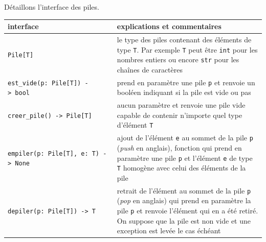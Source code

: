 \documentclass[a4paper,17pt]{extarticle}
\begin{document}
    Détaillons l'interface des piles.

\begin{longtable}[]{@{}ll@{}}
\toprule
\begin{minipage}[b]{0.47\columnwidth}\raggedright
interface\strut
\end{minipage} & \begin{minipage}[b]{0.47\columnwidth}\raggedright
explications et commentaires\strut
\end{minipage}\tabularnewline
\midrule
\endhead
\begin{minipage}[t]{0.47\columnwidth}\raggedright
\texttt{Pile{[}T{]}}\strut
\end{minipage} & \begin{minipage}[t]{0.47\columnwidth}\raggedright
le type des piles contenant des éléments de type \texttt{T}. Par exemple
\texttt{T} peut être \texttt{int} pour les nombres entiers ou encore
\texttt{str} pour les chaînes de caractères\strut
\end{minipage}\tabularnewline
\begin{minipage}[t]{0.47\columnwidth}\raggedright
\texttt{est\_vide(p:\ Pile{[}T{]})\ -\textgreater{}\ bool}\strut
\end{minipage} & \begin{minipage}[t]{0.47\columnwidth}\raggedright
prend en paramètre une pile \texttt{p} et renvoie un booléen indiquant
si la pile est vide ou pas\strut
\end{minipage}\tabularnewline
\begin{minipage}[t]{0.47\columnwidth}\raggedright
\texttt{creer\_pile()\ -\textgreater{}\ Pile{[}T{]}}\strut
\end{minipage} & \begin{minipage}[t]{0.47\columnwidth}\raggedright
aucun paramètre et renvoie une pile vide capable de contenir n'importe
quel type d'élément \texttt{T}\strut
\end{minipage}\tabularnewline
\begin{minipage}[t]{0.47\columnwidth}\raggedright
\texttt{empiler(p:\ Pile{[}T{]},\ e:\ T)\ -\textgreater{}\ None}\strut
\end{minipage} & \begin{minipage}[t]{0.47\columnwidth}\raggedright
ajout de l'élément \texttt{e} au sommet de la pile \texttt{p}
(\emph{push} en anglais), fonction qui prend en paramètre une pile
\texttt{p} et l'élément \texttt{e} de type \texttt{T} homogène avec
celui des éléments de la pile\strut
\end{minipage}\tabularnewline
\begin{minipage}[t]{0.47\columnwidth}\raggedright
\texttt{depiler(p:\ Pile{[}T{]})\ -\textgreater{}\ T}\strut
\end{minipage} & \begin{minipage}[t]{0.47\columnwidth}\raggedright
retrait de l'élément au sommet de la pile \texttt{p} (\emph{pop} en
anglais) qui prend en paramètre la pile \texttt{p} et renvoie l'élément
qui en a été retiré. On suppose que la pile est non vide et une
exception est levée le cas échéant\strut
\end{minipage}\tabularnewline
\bottomrule
\end{longtable}
\end{document}
